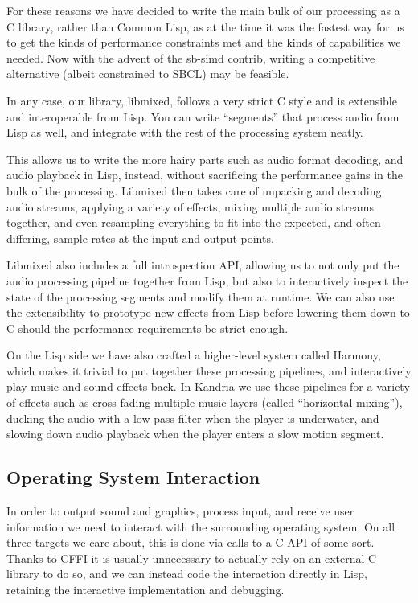 \documentclass[format=sigconf]{acmart}
\begin{document}
For these reasons we have decided to write the main bulk of our processing as a C library, rather than Common Lisp, as at the time it was the fastest way for us to get the kinds of performance constraints met and the kinds of capabilities we needed. Now with the advent of the sb-simd contrib, writing a competitive alternative (albeit constrained to SBCL) may be feasible.

In any case, our library, libmixed, follows a very strict C style and is extensible and interoperable from Lisp. You can write ``segments'' that process audio from Lisp as well, and integrate with the rest of the processing system neatly.

This allows us to write the more hairy parts such as audio format decoding, and audio playback in Lisp, instead, without sacrificing the performance gains in the bulk of the processing. Libmixed then takes care of unpacking and decoding audio streams, applying a variety of effects, mixing multiple audio streams together, and even resampling everything to fit into the expected, and often differing, sample rates at the input and output points.

Libmixed also includes a full introspection API, allowing us to not only put the audio processing pipeline together from Lisp, but also to interactively inspect the state of the processing segments and modify them at runtime. We can also use the extensibility to prototype new effects from Lisp before lowering them down to C should the performance requirements be strict enough.

On the Lisp side we have also crafted a higher-level system called Harmony, which makes it trivial to put together these processing pipelines, and interactively play music and sound effects back. In Kandria we use these pipelines for a variety of effects such as cross fading multiple music layers (called ``horizontal mixing''), ducking the audio with a low pass filter when the player is underwater, and slowing down audio playback when the player enters a slow motion segment.

\subsection{Operating System Interaction}\label{os}
In order to output sound and graphics, process input, and receive user information we need to interact with the surrounding operating system. On all three targets we care about, this is done via calls to a C API of some sort. Thanks to CFFI it is usually unnecessary to actually rely on an external C library to do so, and we can instead code the interaction directly in Lisp, retaining the interactive implementation and debugging.
\end{document}
